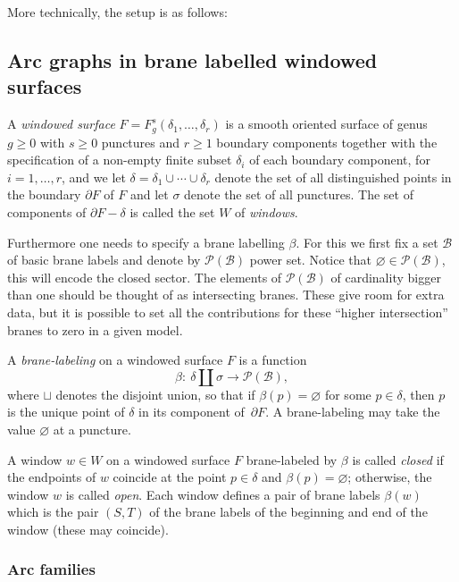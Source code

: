\documentclass[pdftex]{sigma}
\def\calB{{\mathcal B}}
\def\calP{{\mathcal P}}
\begin{document}
More technically, the setup is as follows:

\subsection{Arc graphs in brane labelled windowed surfaces}

A {\it windowed surface} $F=F^s_g(\delta_1,\ldots ,\delta _r)$ is a
smooth oriented surface of genus $g\geq 0$ with $s\geq 0$ punctures and
$r\geq 1$ boundary components together with the specif\/ication of a
non-empty f\/inite subset $\delta _i$ of each boundary component,
for $i=1,\ldots ,r$, and we let $\delta =\delta
_1\cup\cdots\cup\delta _r$ denote the set of all distinguished points in the boundary
$\partial F$ of $F$ and let  $\sigma$ denote the set of all punctures.
The set of components of
$\partial F-\delta$ is called the set $W$ of {\it windows}.

Furthermore one needs to specify a brane labelling $\beta$.
For this we f\/irst f\/ix a set $\calB$ of basic brane labels
and denote by $\calP(\calB)$  power set.  Notice that $\varnothing\in\calP(\calB) $,
this will encode the closed sector. The elements of $\calP(\calB)$ of cardinality
bigger than one should be thought of as intersecting branes. These
give room for extra data, but it is possible to set all the contributions
for these  ``higher intersection'' branes
to zero in a given model.


A {\it brane-labeling} on a windowed surface $F$ is a function
\[
\beta : \ \delta\coprod\sigma\to{\mathcal P}({\mathcal B}),
\]
where $\sqcup$ denotes the disjoint union, so that if $\beta
(p)=\varnothing$ for some $p\in\delta$, then $p$ is the unique point
of $\delta$ in its component of~$\partial F$.  A brane-labeling
may take the value $\varnothing$ at a puncture.



A window $w\in W$ on a windowed surface $F$ brane-labeled by
$\beta$ is called {\it closed} if the endpoints of $w$ coincide at
the point $p\in\delta$ and $\beta (p)=\varnothing$; otherwise, the
window $w$ is called {\it open}.
Each window def\/ines a pair of brane labels $\beta(w)$ which is
the pair $(S,T)$ of the brane labels of the beginning and end of the window (these
may coincide).

\subsubsection{Arc families}
\end{document}
